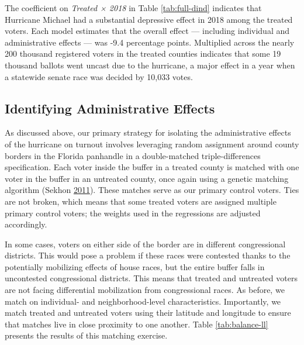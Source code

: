\documentclass[
  12pt,
]{article}
\begin{document}
\begin{singlespace}

\end{singlespace}

The coefficient on \emph{Treated × 2018} in Table \ref{tab:full-dind} indicates that Hurricane Michael had a substantial depressive effect in 2018 among the treated voters. Each model estimates that the overall effect --- including individual and administrative effects --- was -9.4 percentage points. Multiplied across the nearly 200 thousand registered voters in the treated counties indicates that some 19 thousand ballots went uncast due to the hurricane, a major effect in a year when a statewide senate race was decided by 10,033 votes.

\hypertarget{identifying-administrative-effects}{%
\subsection*{Identifying Administrative Effects}\label{identifying-administrative-effects}}

As discussed above, our primary strategy for isolating the administrative effects of the hurricane on turnout involves leveraging random assignment around county borders in the Florida panhandle in a double-matched triple-differences specification. Each voter inside the buffer in a treated county is matched with one voter in the buffer in an untreated county, once again using a genetic matching algorithm (Sekhon \protect\hyperlink{ref-Sekhon2011}{2011}). These matches serve as our primary control voters. Ties are not broken, which means that some treated voters are assigned multiple primary control voters; the weights used in the regressions are adjusted accordingly.

In some cases, voters on either side of the border are in different congressional districts. This would pose a problem if these races were contested thanks to the potentially mobilizing effects of house races, but the entire buffer falls in uncontested congressional districts. This means that treated and untreated voters are not facing differential mobilization from congressional races. As before, we match on individual- and neighborhood-level characteristics. Importantly, we match treated and untreated voters using their latitude and longitude to ensure that matches live in close proximity to one another. Table \ref{tab:balance-ll} presents the results of this matching exercise.
\end{document}
